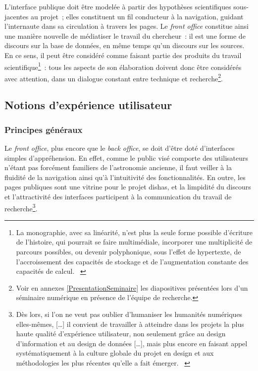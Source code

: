 \documentclass[a4paper,12pt,twoside]{book}
\newcommand{\eng}{\emph}
\newcommand{\p}{[\ldots]\xspace}
\newcommand{\bdd}{base de données\xspace}
\newcommand{\g}[1]{\og#1~\fg}
\newcommand{\dishas}{\gls{dishas}\xspace}
\begin{document}
L'interface publique doit être modelée à partir des hypothèses scientifiques sous-jacentes au projet~; elles constituent un fil conducteur à la navigation, guidant l'internaute dans sa circulation à travers les pages. Le \eng{front office} constitue ainsi une manière nouvelle de médiatiser le travail du chercheur~: il est une forme de discours sur la \bdd, en même temps qu'un discours sur les sources. En ce sens, il peut être considéré comme faisant partie des produits du travail scientifique\footnote{\g{La monographie, avec sa linéarité, n’est plus la seule forme possible d’écriture de l’histoire, qui pourrait se faire multimédiale, incorporer une multiplicité de parcours possibles, ou devenir polyphonique, sous l’effet de hypertexte, de l’accroissement des capacités de stockage et de l’augmentation constante des capacités de calcul.} \cite[§~4]{rygielOrdinateurReseauEcriture2006}}~: tous les aspects de son élaboration doivent donc être considérés avec attention, dans un dialogue constant entre technique et recherche\footnote{Voir en annexes \ref{PresentationSeminaire} les diapositives présentées lors d'un séminaire numérique en présence de l'équipe de recherche.}.

		\subsection{Notions d'expérience utilisateur}
			\subsubsection{Principes généraux}
Le \eng{front office}, plus encore que le \eng{back office}, se doit d'être doté d'interfaces simples d'appréhension. En effet, comme le public visé comporte des utilisateurs n'étant pas forcément familiers de l'astronomie ancienne, il faut veiller à la fluidité de la navigation ainsi qu'à l'intuitivité des fonctionnalités. En outre, les pages publiques sont une vitrine pour le projet \dishas, et la limpidité du discours et l'attractivité des interfaces participent à la communication du travail de recherche\footnote{\g{Dès lors, si l’on ne veut pas oublier d’humaniser les humanités numériques elles­-mêmes, \p il convient de travailler à atteindre dans les projets la plus haute qualité d’expérience utilisateur, non seulement grâce au design d’information et au design de données \p, mais plus encore en faisant appel systématiquement à la culture globale du projet en design et aux méthodologies les plus récentes qu’elle a fait émerger.} \cite{clavertDesignDigitalHumanities}}.
\end{document}
